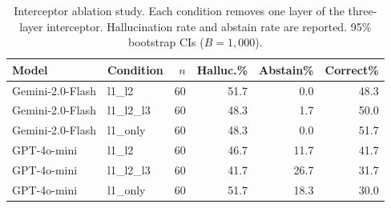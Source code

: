 \begin{table}[t]
\centering
\caption{Interceptor ablation study. Each condition removes one layer of the three-layer interceptor. Hallucination rate and abstain rate are reported. 95\% bootstrap CIs ($B = 1{,}000$).}
\label{tab:ablation}
\begin{tabular}{l l r r r r}
\toprule
Model & Condition & $n$ & Halluc.\% & Abstain\% & Correct\% \\
\midrule
Gemini-2.0-Flash & l1_l2 & 60 & 51.7 & 0.0 & 48.3 \\
Gemini-2.0-Flash & l1_l2_l3 & 60 & 48.3 & 1.7 & 50.0 \\
Gemini-2.0-Flash & l1_only & 60 & 48.3 & 0.0 & 51.7 \\
\midrule
GPT-4o-mini & l1_l2 & 60 & 46.7 & 11.7 & 41.7 \\
GPT-4o-mini & l1_l2_l3 & 60 & 41.7 & 26.7 & 31.7 \\
GPT-4o-mini & l1_only & 60 & 51.7 & 18.3 & 30.0 \\
\bottomrule
\end{tabular}
\end{table}